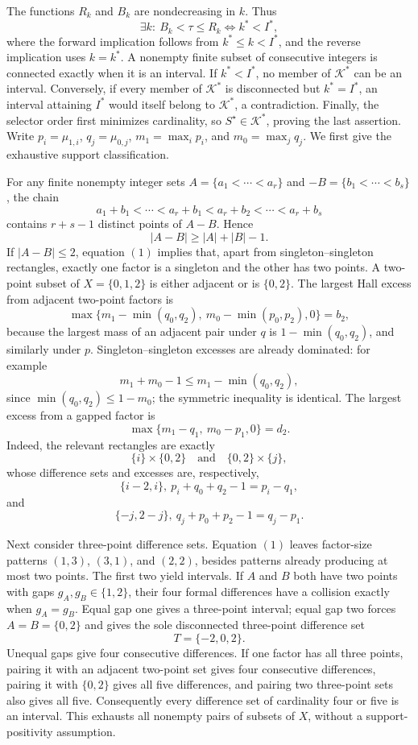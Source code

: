 The functions \(R_k\) and \(B_k\) are nondecreasing in \(k\).  Thus
\[
\exists k:\ B_k<\tau\leq R_k
\iff k^*<I^*,
\]
where the forward implication follows from \(k^*\leq k<I^*\), and the reverse implication uses \(k=k^*\).  A nonempty finite subset of consecutive integers is connected exactly when it is an interval.  If \(k^*<I^*\), no member of \(\mathcal K^*\) can be an interval.  Conversely, if every member of \(\mathcal K^*\) is disconnected but \(k^*=I^*\), an interval attaining \(I^*\) would itself belong to \(\mathcal K^*\), a contradiction.  Finally, the selector order first minimizes cardinality, so \(S^\star\in\mathcal K^*\), proving the last assertion.
Write \(p_i=\mu_{1,i}\), \(q_j=\mu_{0,j}\), \(m_1=\max_i p_i\), and \(m_0=\max_j q_j\).  We first give the exhaustive support classification.

For any finite nonempty integer sets \(A=\{a_1<\cdots<a_r\}\) and \(-B=\{b_1<\cdots<b_s\}\), the chain
\[
a_1+b_1<\cdots<a_r+b_1<a_r+b_2<\cdots<a_r+b_s
\]
contains \(r+s-1\) distinct points of \(A-B\).  Hence
\[
|A-B|\geq|A|+|B|-1. \tag{1}
\]
If \(|A-B|\leq2\), equation \((1)\) implies that, apart from singleton--singleton rectangles, exactly one factor is a singleton and the other has two points.  A two-point subset of \(X=\{0,1,2\}\) is either adjacent or is \(\{0,2\}\).  The largest Hall excess from adjacent two-point factors is
\[
\max\{m_1-\min(q_0,q_2),\ m_0-\min(p_0,p_2),0\}=b_2,
\]
because the largest mass of an adjacent pair under \(q\) is \(1-\min(q_0,q_2)\), and similarly under \(p\).  Singleton--singleton excesses are already dominated: for example
\[
m_1+m_0-1\leq m_1-\min(q_0,q_2),
\]
since \(\min(q_0,q_2)\leq1-m_0\); the symmetric inequality is identical.  The largest excess from a gapped factor is
\[
\max\{m_1-q_1,\ m_0-p_1,0\}=d_2. \tag{2}
\]
Indeed, the relevant rectangles are exactly
\[
\{i\}\times\{0,2\}
\quad\text{and}\quad
\{0,2\}\times\{j\},
\]
whose difference sets and excesses are, respectively,
\[
\{i-2,i\},\ p_i+q_0+q_2-1=p_i-q_1,
\]
and
\[
\{-j,2-j\},\ q_j+p_0+p_2-1=q_j-p_1. \tag{3}
\]

Next consider three-point difference sets.  Equation \((1)\) leaves factor-size patterns \((1,3)\), \((3,1)\), and \((2,2)\), besides patterns already producing at most two points.  The first two yield intervals.  If \(A\) and \(B\) both have two points with gaps \(g_A,g_B\in\{1,2\}\), their four formal differences have a collision exactly when \(g_A=g_B\).  Equal gap one gives a three-point interval; equal gap two forces \(A=B=\{0,2\}\) and gives the sole disconnected three-point difference set
\[
T=\{-2,0,2\}. \tag{4}
\]
Unequal gaps give four consecutive differences.  If one factor has all three points, pairing it with an adjacent two-point set gives four consecutive differences, pairing it with \(\{0,2\}\) gives all five differences, and pairing two three-point sets also gives all five.  Consequently every difference set of cardinality four or five is an interval.  This exhausts all nonempty pairs of subsets of \(X\), without a support-positivity assumption.

